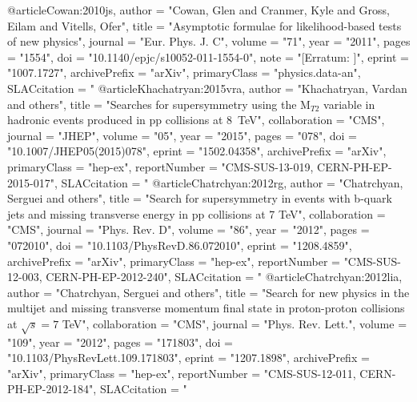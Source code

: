 @article{Cowan:2010js,
      author         = "Cowan, Glen and Cranmer, Kyle and Gross, Eilam and
                        Vitells, Ofer",
      title          = "Asymptotic formulae for likelihood-based tests of new
                        physics",
      journal        = "Eur. Phys. J. C",
      volume         = "71",
      year           = "2011",
      pages          = "1554",
      doi            = "10.1140/epjc/s10052-011-1554-0",
      note           = "[Erratum: ]",
      eprint         = "1007.1727",
      archivePrefix  = "arXiv",
      primaryClass   = "physics.data-an",
      SLACcitation   = "%
}
@article{Khachatryan:2015vra,
      author         = "Khachatryan, Vardan and others",
      title          = "{Searches for supersymmetry using the M$_{T2}$ variable
                        in hadronic events produced in pp collisions at 8~TeV}",
      collaboration  = "CMS",
      journal        = "JHEP",
      volume         = "05",
      year           = "2015",
      pages          = "078",
      doi            = "10.1007/JHEP05(2015)078",
      eprint         = "1502.04358",
      archivePrefix  = "arXiv",
      primaryClass   = "hep-ex",
      reportNumber   = "CMS-SUS-13-019, CERN-PH-EP-2015-017",
      SLACcitation   = "%
}
@article{Chatrchyan:2012rg,
      author         = "Chatrchyan, Serguei and others",
      title          = "{Search for supersymmetry in events with b-quark jets and
                        missing transverse energy in pp collisions at 7 TeV}",
      collaboration  = "CMS",
      journal        = "Phys. Rev. D",
      volume         = "86",
      year           = "2012",
      pages          = "072010",
      doi            = "10.1103/PhysRevD.86.072010",
      eprint         = "1208.4859",
      archivePrefix  = "arXiv",
      primaryClass   = "hep-ex",
      reportNumber   = "CMS-SUS-12-003, CERN-PH-EP-2012-240",
      SLACcitation   = "%
}
@article{Chatrchyan:2012lia,
      author         = "Chatrchyan, Serguei and others",
      title          = "{Search for new physics in the multijet and missing
                        transverse momentum final state in proton-proton
                        collisions at $\sqrt{s} = 7$ TeV}",
      collaboration  = "CMS",
      journal        = "Phys. Rev. Lett.",
      volume         = "109",
      year           = "2012",
      pages          = "171803",
      doi            = "10.1103/PhysRevLett.109.171803",
      eprint         = "1207.1898",
      archivePrefix  = "arXiv",
      primaryClass   = "hep-ex",
      reportNumber   = "CMS-SUS-12-011, CERN-PH-EP-2012-184",
      SLACcitation   = "%
}
